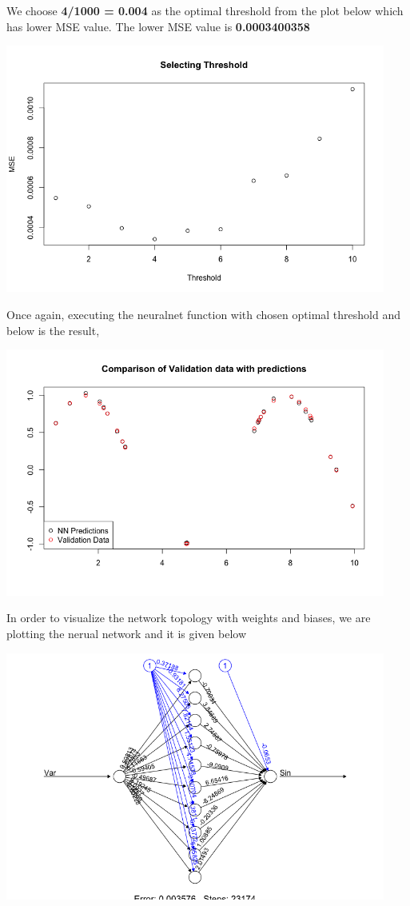 \documentclass[a4paper,10pt]{article}
\begin{document}
We choose \textbf{4/1000 = 0.004} as the optimal threshold from the plot below which has lower MSE value. The lower MSE value is \textbf{0.0003400358} \par
\begin{center}
  \includegraphics[width=125mm,scale=0.10]{Thresold_plot.png} 
\end{center}
\newpage
Once again, executing the neuralnet function with chosen optimal threshold and below is the result,
\begin{center}
  \includegraphics[width=125mm,scale=0.10]{NeuralNet_Predictions.png} 
\end{center}
In order to visualize the network topology with weights and biases, we are plotting the nerual network and it is given below
\begin{center}
  \includegraphics[width=125mm,scale=0.10]{Neural_Net_Topology.png} 
\end{center}
\end{document}
